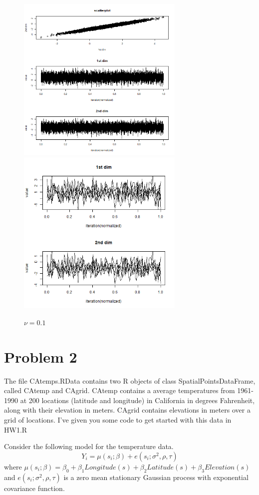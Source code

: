 \documentclass{article}
\begin{document}
\begin{figure}[hh]
    \centering
    \includegraphics[height=8cm]{prob1_test3_scatter.png}
    \includegraphics[height=8cm]{prob1_test3_traceplot.png}
    \caption{$\nu=0.1$}
\end{figure}




\section{Problem 2}
The file CAtemps.RData contains two R objects of class SpatialPointsDataFrame, called CAtemp and CAgrid.
CAtemp contains a average temperatures from 1961-1990 at 200 locations (latitude and longitude) in California in degrees Fahrenheit, along with their elevation in meters.
CAgrid contains elevations in meters over a grid of locations.
I've given you some code to get started with this data in HW1.R

Consider the following model for the temperature data.
\[Y_i = \mu(s_i;\beta) + e(s_i; \sigma^2, \rho, \tau)\]
where \(\mu(s_i;\beta)=\beta_0+\beta_1 Longitude(s) + \beta_2 Latitude(s)
+\beta_3 Elevation(s)\) and \(e(s_i;\sigma^2,\rho,\tau)\) is a zero mean stationary Gaussian process with
exponential covariance function.
\end{document}
